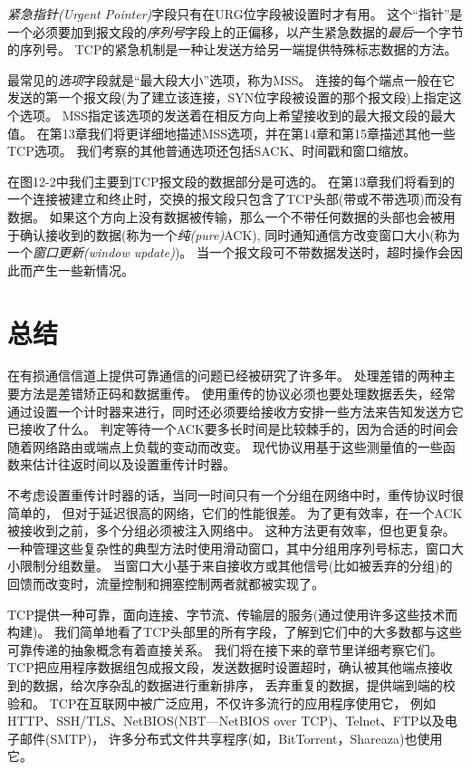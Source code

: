 \documentclass{../main.tex}{subfiles}
\begin{document}
\emph{紧急指针(Urgent Pointer)}字段只有在URG位字段被设置时才有用。
这个``指针''是一个必须要加到报文段的\emph{序列号}字段上的正偏移，以产生紧急数据的\emph{最后}一个字节的序列号。
TCP的紧急机制是一种让发送方给另一端提供特殊标志数据的方法。

最常见的\emph{选项}字段就是``最大段大小''选项，称为MSS。
连接的每个端点一般在它发送的第一个报文段(为了建立该连接，SYN位字段被设置的那个报文段)上指定这个选项。
MSS指定该选项的发送着在相反方向上希望接收到的最大报文段的最大值。
在第13章我们将更详细地描述MSS选项，并在第14章和第15章描述其他一些TCP选项。
我们考察的其他普通选项还包括SACK、时间戳和窗口缩放。

在图12-2中我们主要到TCP报文段的数据部分是可选的。
在第13章我们将看到的一个连接被建立和终止时，交换的报文段只包含了TCP头部(带或不带选项)而没有数据。
如果这个方向上没有数据被传输，那么一个不带任何数据的头部也会被用于确认接收到的数据(称为一个\emph{纯(pure)}ACK),
同时通知通信方改变窗口大小(称为一个\emph{窗口更新(window update)})。
当一个报文段可不带数据发送时，超时操作会因此而产生一些新情况。

\section{总结}
在有损通信信道上提供可靠通信的问题已经被研究了许多年。
处理差错的两种主要方法是差错矫正码和数据重传。
使用重传的协议必须也要处理数据丢失，经常通过设置一个计时器来进行，同时还必须要给接收方安排一些方法来告知发送方它已接收了什么。
判定等待一个ACK要多长时间是比较棘手的，因为合适的时间会随着网络路由或端点上负载的变动而改变。
现代协议用基于这些测量值的一些函数来估计往返时间以及设置重传计时器。

不考虑设置重传计时器的话，当同一时间只有一个分组在网络中时，重传协议时很简单的，
但对于延迟很高的网络，它们的性能很差。
为了更有效率，在一个ACK被接收到之前，多个分组必须被注入网络中。
这种方法更有效率，但也更复杂。
一种管理这些复杂性的典型方法时使用滑动窗口，其中分组用序列号标志，窗口大小限制分组数量。
当窗口大小基于来自接收方或其他信号(比如被丢弃的分组)的回馈而改变时，流量控制和拥塞控制两者就都被实现了。

TCP提供一种可靠，面向连接、字节流、传输层的服务(通过使用许多这些技术而构建)。
我们简单地看了TCP头部里的所有字段，了解到它们中的大多数都与这些可靠传递的抽象概念有着直接关系。
我们将在接下来的章节里详细考察它们。
TCP把应用程序数据组包成报文段，发送数据时设置超时，确认被其他端点接收到的数据，给次序杂乱的数据进行重新排序，
丢弃重复的数据，提供端到端的校验和。
TCP在互联网中被广泛应用，不仅许多流行的应用程序使用它，
例如HTTP、SSH/TLS、NetBIOS(NBT---NetBIOS over TCP)、Telnet、FTP以及电子邮件(SMTP)，
许多分布式文件共享程序(如，BitTorrent，Shareaza)也使用它。
\end{document}
